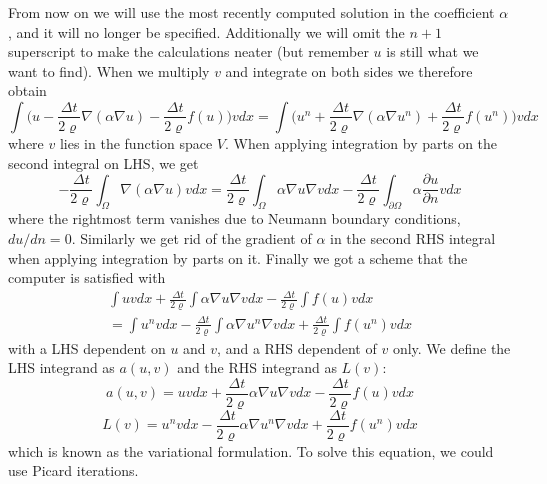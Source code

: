 \documentclass[norsk,a4paper,12pt]{article}
\begin{document}
From now on we will use the most recently computed solution in the coefficient $\alpha$, and it will no longer be specified. Additionally we will omit the $n+1$ superscript to make the calculations neater (but remember $u$ is still what we want to find). When we multiply $v$ and integrate on both sides we therefore obtain
\begin{equation*}
\int\bigg(u-\frac{\Delta t}{2\varrho}\nabla(\alpha\nabla u)-\frac{\Delta t}{2\varrho}f(u)\bigg)vdx= \int\bigg(u^{n}+\frac{\Delta t}{2\varrho}\nabla(\alpha\nabla u^{n})+\frac{\Delta t}{2\varrho}f(u^{n})\bigg)vdx
\end{equation*}
where $v$ lies in the function space $V$. When applying integration by parts on the second integral on LHS, we get
\begin{equation}
-\frac{\Delta t}{2\varrho}\int_{\Omega}\nabla(\alpha\nabla u)vdx=\frac{\Delta t}{2\varrho}\int_{\Omega}\alpha\nabla u\nabla v dx - \frac{\Delta t}{2\varrho}\int_{\partial\Omega}\alpha\frac{\partial u}{\partial n}vdx
\end{equation}
where the rightmost term vanishes due to Neumann boundary conditions, $du/dn=0$. Similarly we get rid of the gradient of $\alpha$ in the second RHS integral when applying integration by parts on it. Finally we got a scheme that the computer is satisfied with
\begin{equation}
\begin{split}
\int uvdx+\frac{\Delta t}{2\varrho}\int\alpha\nabla u\nabla vdx-\frac{\Delta t}{2\varrho}\int f(u)vdx\\
=\int u^nvdx-\frac{\Delta t}{2\varrho}\int\alpha\nabla u^n\nabla vdx+\frac{\Delta t}{2\varrho}\int f(u^n)vdx
\end{split}
\end{equation}
with a LHS dependent on $u$ and $v$, and a RHS dependent of $v$ only. We define the LHS integrand as $a(u,v)$ and the RHS integrand as $L(v)$:
\begin{equation}
a(u,v)=uvdx+\frac{\Delta t}{2\varrho}\alpha\nabla u\nabla vdx-\frac{\Delta t}{2\varrho}f(u)vdx
\end{equation}
\begin{equation}
L(v)=u^nvdx-\frac{\Delta t}{2\varrho}\alpha\nabla u^n\nabla vdx+\frac{\Delta t}{2\varrho}f(u^n)vdx
\end{equation}
which is known as the variational formulation. To solve this equation, we could use Picard iterations.
\end{document}

